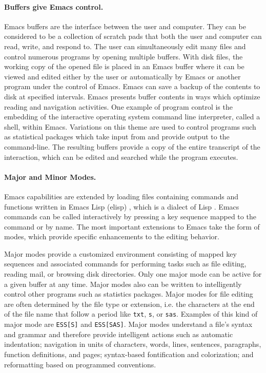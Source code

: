 \documentclass{article}
\newcommand{\stexttt}[1]{{\small\texttt{#1}}}
\begin{document}
\paragraph{Buffers give Emacs control.}
Emacs buffers are the interface between the user and computer.  They
can be considered to be a collection of scratch pads that both the
user and computer can read, write, and respond to.  The user can
simultaneously edit many files and control numerous programs by
opening multiple buffers.  With disk files, the working copy of the
opened file is placed in an Emacs buffer where it can be viewed and
edited either by the user or automatically by Emacs or another program
under the control of Emacs.  Emacs can save a backup of the contents
to disk at specified intervals.  Emacs presents buffer contents in
ways which optimize reading and navigation activities.  One example of
program control is the embedding of the interactive operating system
command line interpreter, called a shell, within Emacs.  Variations on
this theme are used to control programs such as statistical packages
which take input from and provide output to the command-line.  The
resulting buffers provide a copy of the entire transcript of the
interaction, which can be edited and searched while the program
executes.

\paragraph{Major and Minor Modes.}
Emacs capabilities are extended by loading
files containing commands and functions written in Emacs Lisp (elisp)
\citep{RChassell1999}, which is a dialect of Lisp
\citep{PGraham:1996}.  Emacs commands can be called interactively by
pressing a key sequence mapped to the command or by name.
The most important extensions to Emacs take the form of modes, which
provide specific enhancements to the editing behavior.

Major modes provide a customized environment consisting of mapped key
sequences and associated commands for performing tasks such as file
editing, reading mail, or browsing disk directories.  Only one major
mode can be active for a given buffer at any time.  Major modes also
can be written to intelligently control other programs such as
statistics packages.  Major modes for file editing are often
determined by the file type or extension, i.e.  the characters at the
end of the file name that follow a period like \stexttt{txt},
\stexttt{s}, or \stexttt{sas}.  Examples of this kind of major mode are
\stexttt{ESS[S]} and \stexttt{ESS[SAS]}.  Major modes understand a
file's syntax and grammar and therefore provide intelligent
actions such as automatic indentation; navigation in units of
characters, words, lines, sentences, paragraphs, function definitions,
and pages; syntax-based fontification and colorization; and
reformatting based on programmed conventions.
\end{document}
